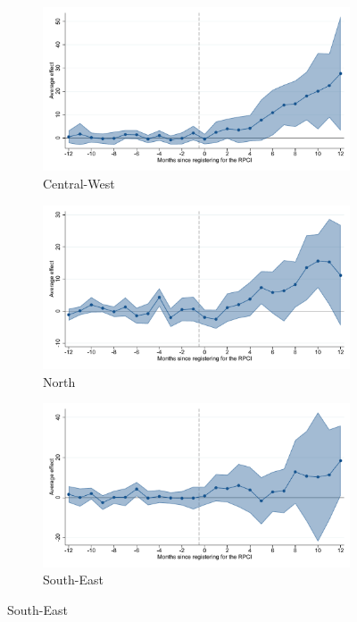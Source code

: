 \begin{figure}[H]
    \begin{subfigure}{0.32\textwidth}
    \caption{Central-West}
    \includegraphics[width=\textwidth]{04_Figures/muestra_10porciento/event_study_sal_cierre_reg_centro_occ_dcdh_connected.pdf}
    \end{subfigure}
    \begin{subfigure}{0.32\textwidth}
    \caption{North}
    \includegraphics[width=\textwidth]{04_Figures/muestra_10porciento/event_study_sal_cierre_reg_norte_dcdh_connected.pdf}
    \end{subfigure}
    \begin{subfigure}{0.32\textwidth}
    \caption{South-East}
    \includegraphics[width=\textwidth]{04_Figures/muestra_10porciento/event_study_sal_cierre_reg_sur_dcdh_connected.pdf}
    \end{subfigure}


\end{figure}
